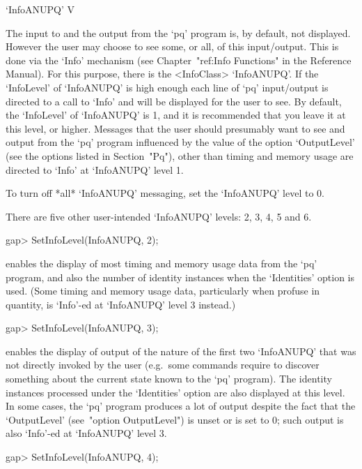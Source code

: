 
\>`InfoANUPQ' V

The input to and the output from the `pq' program  is,  by  default,  not
displayed. However the user may choose to  see  some,  or  all,  of  this
input/output.   This   is   done   via   the   `Info'   mechanism    (see
Chapter~"ref:Info Functions" in the {\GAP} Reference  Manual).  For  this
purpose, there is the <InfoClass>  `InfoANUPQ'.  If  the  `InfoLevel'  of
`InfoANUPQ' is high enough each line of `pq' input/output is directed  to
a call to `Info' and will be displayed for the user to see.  By  default,
the `InfoLevel' of `InfoANUPQ' is 1, and it is recommended that you leave
it at this level, or higher. Messages that  the  user  should  presumably
want to see and output from the `pq' program influenced by the  value  of
the option `OutputLevel' (see the options listed in Section~"Pq"),  other
than timing and memory usage are directed to `Info' at `InfoANUPQ'  level
1.

To turn off *all* `InfoANUPQ' messaging, set the `InfoANUPQ' level to 0.

There are five other user-intended `InfoANUPQ' levels: 2, 3, 4, 5 and 6.

\beginexample
gap> SetInfoLevel(InfoANUPQ, 2);
\endexample

enables the display of most timing and memory usage data  from  the  `pq'
program, and also the number of identity instances when the  `Identities'
option is used. (Some timing and memory  usage  data,  particularly  when
profuse in quantity, is `Info'-ed at `InfoANUPQ' level 3 instead.)

\beginexample
gap> SetInfoLevel(InfoANUPQ, 3);
\endexample

enables the display of output of the nature of the first two  `InfoANUPQ'
that was not directly invoked by the  user  (e.g.~some  commands  require
{\GAP} to discover something about the current state known  to  the  `pq'
program). The identity instances processed under the `Identities'  option
are also displayed at  this  level.  In  some  cases,  the  `pq'  program
produces a  lot  of  output  despite  the  fact  that  the  `OutputLevel'
(see~"option OutputLevel") is unset or is set to 0; such output  is  also
`Info'-ed at `InfoANUPQ' level 3.

\beginexample
gap> SetInfoLevel(InfoANUPQ, 4);
\endexample


